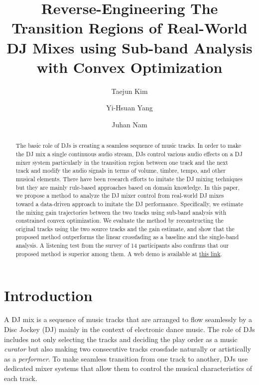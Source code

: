 \documentclass[sigconf]{nimeart}
\begin{document}
\title[Reverse-Engineering The Transition Regions of Real-World DJ Mixes…]{Reverse-Engineering The Transition Regions of Real-World DJ Mixes using Sub-band Analysis with Convex Optimization}
\author{Taejun Kim}
\author{Yi-Hsuan Yang}
\author{Juhan Nam}
\renewcommand{\shortauthors}{Kim et al.}
\begin{abstract}
The basic role of DJs is creating a seamless sequence of music tracks. In order to make the DJ mix a single continuous audio stream, DJs control various audio effects on a DJ mixer system particularly in the transition region between one track and the next track and modify the audio signals in terms of volume, timbre, tempo, and other musical elements. There have been research efforts to imitate the DJ mixing techniques but they are mainly rule-based approaches based on domain knowledge. In this paper, we propose a method to analyze the DJ mixer control from real-world DJ mixes toward a data-driven approach to imitate the DJ performance. Specifically, we estimate the mixing gain trajectories between the two tracks using sub-band analysis with constrained convex optimization. We evaluate the method by reconstructing the original tracks using the two source tracks and the gain estimate, and show that the proposed method outperforms the linear crossfading as a baseline and the single-band analysis. A listening test from the survey of 14 participants also confirms that our proposed method is superior among them. A web demo is available at \href{https://mir-aidj.github.io/transition-analysis/}{this link}.
\end{abstract}

\maketitle
\section{Introduction}\label{introduction}

A DJ mix is a sequence of music tracks that are arranged to flow seamlessly by a Disc Jockey (DJ) mainly in the context of electronic dance music. The role of DJs includes not only selecting the tracks and deciding the play order as a music \emph{curator} but also making two consecutive tracks crossfade naturally or artistically as a \emph{performer}. To make seamless transition from one track to another, DJs use dedicated mixer systems that allow them to control the musical characteristics of each track.
\end{document}
